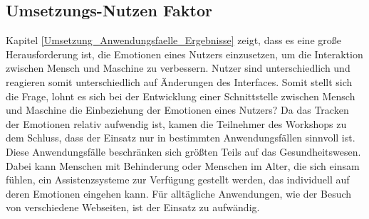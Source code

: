 \subsection{Umsetzungs-Nutzen Faktor}
Kapitel \ref{Umsetzung_Anwendungsfaelle_Ergebnisse} zeigt, dass es eine große Herausforderung ist, die Emotionen eines Nutzers einzusetzen, um die Interaktion zwischen Mensch und Maschine zu verbessern. Nutzer sind unterschiedlich und reagieren somit unterschiedlich auf Änderungen des Interfaces. Somit stellt sich die Frage, lohnt es sich bei der Entwicklung einer Schnittstelle zwischen Mensch und Maschine die Einbeziehung der Emotionen eines Nutzers? Da das Tracken der Emotionen relativ aufwendig ist, kamen die Teilnehmer des Workshops zu dem Schluss, dass der Einsatz nur in bestimmten Anwendungsfällen sinnvoll ist. Diese Anwendungsfälle beschränken sich größten Teils auf das Gesundheitswesen. Dabei kann Menschen mit Behinderung oder Menschen im Alter, die sich einsam fühlen, ein Assistenzsysteme zur Verfügung gestellt werden, das individuell auf deren Emotionen eingehen kann. Für alltägliche Anwendungen, wie der Besuch von verschiedene Webseiten, ist der Einsatz zu aufwändig.

